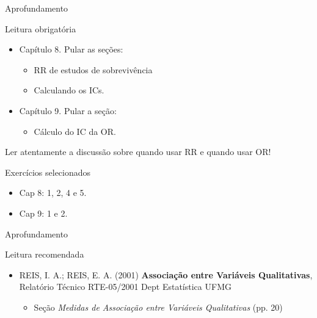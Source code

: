 \documentclass{beamer}
\begin{document}
\begin{frame}{Aprofundamento}
  \footnotesize
  \begin{block}{Leitura obrigatória}
    \begin{itemize}
    \item Capítulo 8. Pular as seções:
      \begin{itemize}
        \scriptsize
      \item RR de estudos de sobrevivência
      \item Calculando os ICs.
      \end{itemize}
    \item Capítulo 9. Pular a seção:
      \begin{itemize}
        \scriptsize
      \item Cálculo do IC da OR.
      \end{itemize}
    \end{itemize}
    \begin{block}{}
      Ler \alert{atentamente} a discussão sobre quando usar RR e quando usar OR!
    \end{block}
  \end{block}
  \begin{block}{Exercícios selecionados}
    \begin{itemize}
    \item Cap 8: 1, 2, 4 e 5.
    \item Cap 9: 1 e 2.
    \end{itemize}
  \end{block}
\end{frame}

\begin{frame}{Aprofundamento}
  \begin{block}{Leitura recomendada}
    \footnotesize
    \begin{itemize}
    \item REIS, I. A.; REIS, E. A. (2001) {\bf Associação entre Variáveis Qualitativas}, Relatório Técnico RTE-05/2001 Dept Estatística UFMG
      \begin{itemize}
        \scriptsize
      \item Seção {\em Medidas de Associação entre Variáveis Qualitativas} (pp. 20)
      \end{itemize}
    \end{itemize}
  \end{block}
\end{frame}
\end{document}
